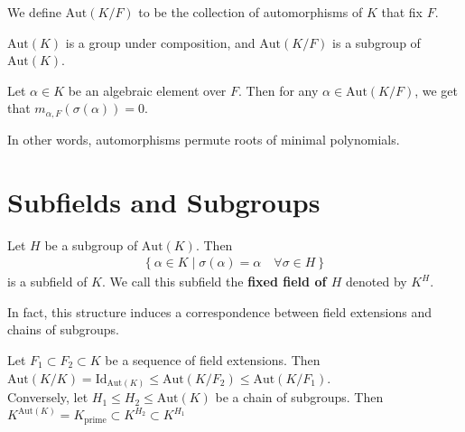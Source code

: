 \documentclass{memoir}
\begin{document}
\begin{defn}
	We define \(\textrm{Aut}(K / F)\) to be the collection of automorphisms of \(K\) that fix \(F\).
\end{defn}

\begin{prop}
	\(\textrm{Aut}(K)\) is a group under composition, and \(\textrm{Aut}(K / F)\) is a subgroup of \(\textrm{Aut}(K)\).
\end{prop}

\begin{prop}
	Let \(\alpha  \in K\) be an algebraic element over \(F\). Then for any \(\alpha \in \textrm{Aut}(K / F)\), we get that \(m_{\alpha ,F}(\sigma (\alpha )) = 0\).
\end{prop}
In other words, automorphisms permute roots of minimal polynomials.

\section{Subfields and Subgroups}
\label{sec:subfields_and_subgroups}

\begin{prop}
	Let \(H\) be a subgroup of \(\textrm{Aut}(K)\). Then 
	\begin{align*}
		\left\{\alpha  \in K \mid \sigma (\alpha ) = \alpha \quad \forall \sigma \in H \right\} 
	\end{align*}
	is a subfield of \(K\). We call this subfield the \textbf{fixed field of \(H\)} denoted by \(K^{H}\).
\end{prop}

In fact, this structure induces a correspondence between field extensions and chains of subgroups.
\begin{prop}
	Let \(F_1 \subset F_2 \subset K\) be a sequence of field extensions. Then \(\textrm{Aut}(K / K) = \textrm{Id}_{\textrm{Aut}(K)} \leq \textrm{Aut}(K / F_2) \leq \textrm{Aut}(K / F_1)\).\\

	Conversely, let \(H_1 \leq H_2 \leq \textrm{Aut}(K)\) be a chain of subgroups. Then \(K^{\textrm{Aut}(K)} = K_{\textrm{prime}} \subset K^{H_2} \subset K^{H_1}\)
\end{prop}
\end{document}
